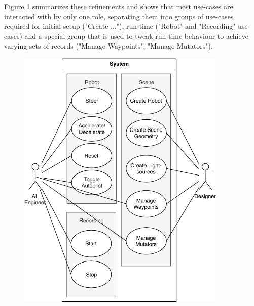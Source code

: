 Figure \ref{fig:use-cases} summarizes these refinements and shows that most use-cases are interacted with by only one role, separating them into groups of use-cases required for initial setup ("Create ..."), run-time ("Robot" and "Recording" use-cases) and a special group that is used to tweak run-time behaviour to achieve varying sets of records ("Manage Waypoints", "Manage Mutators"). 
\begin{figure}
    \centering
    \includegraphics[width=10cm]{img/ch04/UseCases_Fine.pdf}
    \label{fig:use-cases}
\end{figure}
\clearpage

